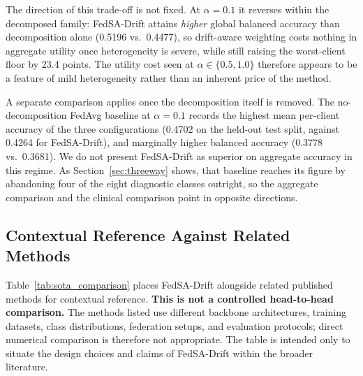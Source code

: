 \documentclass{ieeeaccess}
\newcommand{\sadrift}{FedSA-Drift}
\begin{document}
The direction of this trade-off is not fixed. At $\alpha{=}0.1$ it reverses within the decomposed family: \sadrift{} attains \emph{higher} global balanced accuracy than decomposition alone (0.5196 vs.\ 0.4477), so drift-aware weighting costs nothing in aggregate utility once heterogeneity is severe, while still raising the worst-client floor by 23.4 points. The utility cost seen at $\alpha \in \{0.5, 1.0\}$ therefore appears to be a feature of mild heterogeneity rather than an inherent price of the method.

A separate comparison applies once the decomposition itself is removed. The no-decomposition FedAvg baseline at $\alpha{=}0.1$ records the highest mean per-client accuracy of the three configurations (0.4702 on the held-out test split, against 0.4264 for \sadrift{}), and marginally higher balanced accuracy (0.3778 vs.\ 0.3681). We do not present \sadrift{} as superior on aggregate accuracy in this regime. As Section~\ref{sec:threeway} shows, that baseline reaches its figure by abandoning four of the eight diagnostic classes outright, so the aggregate comparison and the clinical comparison point in opposite directions.

\subsection{Contextual Reference Against Related Methods}
\label{sec:sota_comparison}

Table~\ref{tab:sota_comparison} places \sadrift{} alongside related published methods for contextual reference. \textbf{This is not a controlled head-to-head comparison.} The methods listed use different backbone architectures, training datasets, class distributions, federation setups, and evaluation protocols; direct numerical comparison is therefore not appropriate. The table is intended only to situate the design choices and claims of \sadrift{} within the broader literature.
\end{document}

